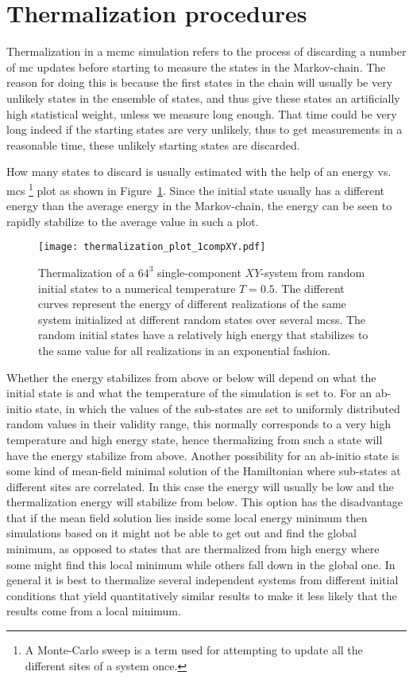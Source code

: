 \section{Thermalization procedures}

Thermalization in a \ac{mcmc} simulation refers to the process of discarding a number of \ac{mc} updates before starting to measure the
states in the Markov-chain. The reason for doing this is because the first states in the chain will usually be very unlikely states in the
ensemble of states, and thus give these states an artificially high statistical weight, unless we measure long enough.
That time could be very long indeed if the starting states are very unlikely, thus to get
measurements in a reasonable time, these unlikely starting states are discarded.

How many states to discard is usually estimated with the help of an energy vs. \ac{mcs}%
\footnote{A Monte-Carlo sweep is a term used for attempting to update all the different sites of a system once.} %
plot as shown in Figure~\ref{fig:Monte:therm_plot}. Since the initial state usually has a different energy than the average energy in the Markov-chain,
the energy can be seen to rapidly stabilize to the average value in such a plot. 

\begin{figure}[t]
    \centering
    \texttt{[image: thermalization\_plot\_1compXY.pdf]}
    \caption{Thermalization of a $64^3$ single-component $XY$-system from random initial states to a numerical temperature $T=0.5$.
    The different curves represent the energy of different realizations of the same
    system initialized at different random states over several \ac{mcs}s. The random initial states have a relatively high energy that stabilizes
    to the same value for all realizations in an exponential fashion.}
    \label{fig:Monte:therm_plot}
\end{figure}

Whether the energy stabilizes from above or below will depend
on what the initial state is and what the temperature of the simulation is set to. For an ab-initio state, in which the values of the sub-states
are set to uniformly distributed random values in their validity range, this normally corresponds to a very high temperature and
high energy state, hence thermalizing from such a state will have the energy stabilize from above. Another possibility for an ab-initio
state is some kind of mean-field minimal solution of the Hamiltonian where sub-states at different sites are correlated. In this case the
energy will usually be low and the thermalization energy will stabilize from below. This option has the disadvantage that if the mean field
solution lies inside some local energy minimum then simulations based on it might not be able to get out and find the global minimum,
as opposed to states that are thermalized from high energy where some might find this local minimum while others fall down in the global one.
In general it is best to thermalize several independent systems from different initial conditions that yield quantitatively similar results
to make it less likely that the results come from a local minimum.

